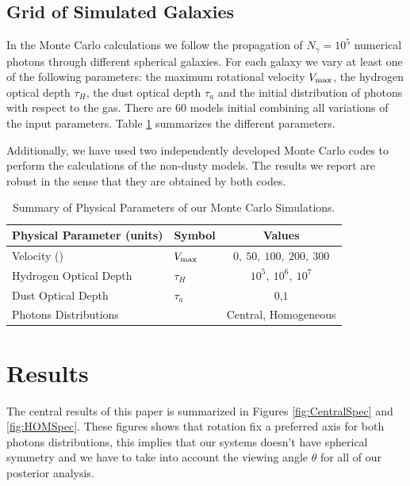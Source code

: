 \documentclass{emulateapj}
\newcommand{\kms}{{\ifmmode{{\mathrm{\,km\ s}^{-1}}}\else{\,km~s$^{-1}$}\fi}}
\begin{document}
\subsection{Grid of Simulated Galaxies}
\label{sec:models}

In the Monte Carlo calculations we follow the propagation of $N_{\gamma}=10^5$
numerical photons through different spherical galaxies. For each galaxy
we vary at least one of the following parameters: the maximum
rotational velocity $V_{\rm max}$, the hydrogen optical depth $\tau_{H}$,
the dust optical depth $\tau_{a}$ and the initial distribution of photons
with respect to the gas. There are $60$ models initial combining all
variations of the input parameters. Table \ref{table:models}
summarizes the different parameters.

Additionally, we have used two independently developed Monte Carlo
codes \citep{CLARA,DijkstraKramer} to perform the calculations of the
non-dusty models. The results we report are robust in the sense
that they are obtained by both codes. 

\begin{table}
\begin{center}
\begin{tabular}{llc}\hline\hline
Physical Parameter (units) & Symbol & Values\\\hline
Velocity (\kms) & $V_{\rm max}$&$0,\ 50,\ 100,\ 200,\ 300$\\
Hydrogen Optical Depth & $\tau_{H} $ & $10^{5},\ 10^{6},\ 10^{7}$\\
Dust Optical Depth & $\tau_{a}$ & $0$,$1$\\
Photons Distributions & & Central, Homogeneous\\\hline\hline
\end{tabular}
\caption{
  Summary of Physical Parameters of our Monte Carlo Simulations.} 
\label{table:models}
\end{center}
\end{table}


\section{Results}
\label{sec:results}

The central results of this paper is summarized in Figures
\ref{fig:CentralSpec} and \ref{fig:HOMSpec}. These figures shows
that rotation fix a preferred axis for both photons distributions, 
this implies that our systems doesn't have spherical symmetry and
we have to take into account the viewing angle $\theta$ for all
of our posterior analysis.  
\end{document}
